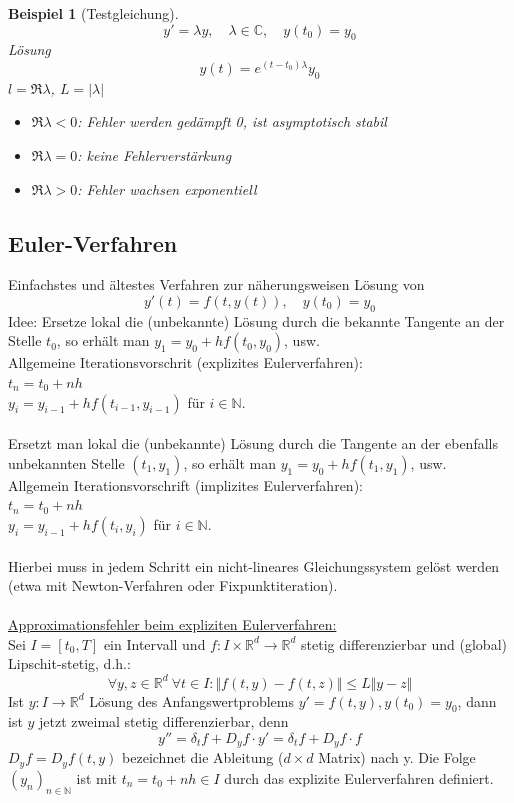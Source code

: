 \documentclass[12pt]{article}
\theoremstyle{break}
\newtheorem{example}[theorem]{Beispiel}
\begin{document}
\begin{example}[Testgleichung]\leavevmode
$$ y' = \lambda y, \quad \lambda \in \mathbb{C}, \quad y(t_0) = y_0$$
Lösung
$$ y(t) = e^{(t-t_0)\lambda}y_0$$
$l = \Re \lambda$, $L = \vert \lambda \vert$
\begin{itemize}
  \item $\Re \lambda < 0$: Fehler werden gedämpft 0, ist asymptotisch stabil
  \item $\Re \lambda = 0$: keine Fehlerverstärkung
  \item $\Re \lambda > 0$: Fehler wachsen exponentiell
\end{itemize}
\end{example}

\subsection{Euler-Verfahren}
Einfachstes und ältestes Verfahren zur näherungsweisen Lösung von
$$y'(t) = f(t, y(t)), \quad y(t_0) = y_0$$
Idee: Ersetze lokal die (unbekannte) Lösung durch die bekannte Tangente an der Stelle $t_0$, so erhält man $y_1 = y_0 + hf(t_0,y_0)$, usw. \\
Allgemeine Iterationsvorschrit (explizites Eulerverfahren):\\
$t_n = t_0 + nh$ \\
$y_i = y_{i-1} + hf(t_{i-1}, y_{i-1})$ für $i\in \mathbb{N}$.\\
\\
Ersetzt man lokal die (unbekannte) Lösung durch die Tangente an der ebenfalls unbekannten Stelle $(t_1, y_1)$, so erhält man $y_1 = y_0 + hf(t_1, y_1)$, usw.\\
Allgemein Iterationsvorschrift (implizites Eulerverfahren):\\
$t_n = t_0 + nh$ \\
$y_i = y_{i-1} + hf(t_{i}, y_{i})$ für $i\in \mathbb{N}$.\\
\\
Hierbei muss in jedem Schritt ein nicht-lineares Gleichungssystem gelöst werden (etwa mit Newton-Verfahren oder Fixpunktiteration).\\
\\
\underline{Approximationsfehler beim expliziten Eulerverfahren:}\\
Sei $I = [t_0, T]$ ein Intervall und $f: I \times \mathbb{R}^d \rightarrow \mathbb{R}^d$ stetig differenzierbar und (global) Lipschit-stetig, d.h.:
$$\forall y, z \in \mathbb{R}^d \medspace \forall t \in I:
\Vert f(t, y) - f(t, z) \Vert \leq L \Vert y-z \Vert$$
Ist $y: I \rightarrow \mathbb{R}^d$ Lösung des Anfangswertproblems $y' = f(t, y), y(t_0) = y_0$, dann ist $y$ jetzt zweimal stetig differenzierbar, denn
$$y'' = \delta_tf + D_yf \cdot y' = \delta_tf + D_yf \cdot f$$
$D_yf = D_yf(t, y)$ bezeichnet die Ableitung ($d \times d$ Matrix) nach y. Die Folge $(y_n)_{n \in \mathbb{N}}$ ist mit $t_n = t_0 + nh \in I$ durch das explizite Eulerverfahren definiert.
\end{document}
